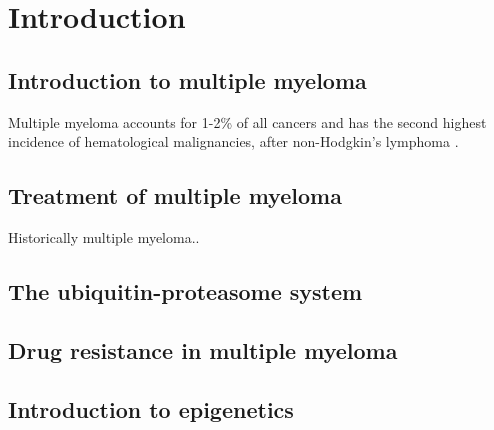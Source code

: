\chapter{\label{ch:1-intro}Introduction} 


\section{Introduction to multiple myeloma}
Multiple myeloma accounts for 1-2\% of all cancers and has the second highest incidence of hematological malignancies, after non-Hodgkin’s lymphoma \cite{international2003criteria}. 


\section{Treatment of multiple myeloma}
Historically multiple myeloma..


\section{The ubiquitin-proteasome system}


\section{Drug resistance in multiple myeloma}


\section{Introduction to epigenetics}